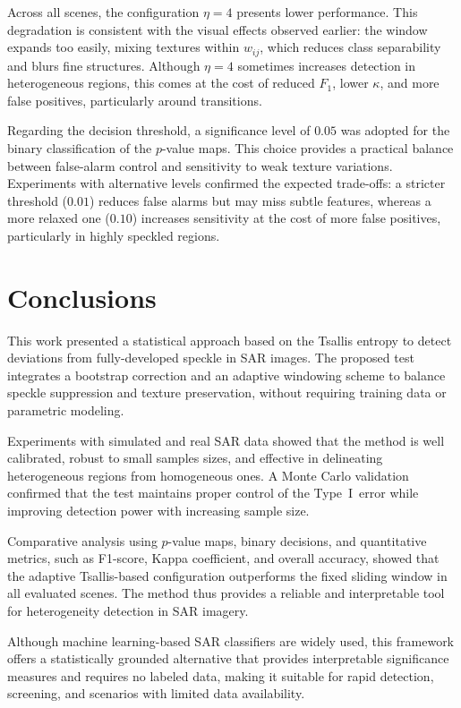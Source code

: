 \documentclass[
  lettersize  journal,
]{IEEEtran}%
\begin{document}
Across all scenes, the configuration \(\eta = 4\) presents lower
performance. This degradation is consistent with the visual effects
observed earlier: the window expands too easily, mixing textures within
\(w_{ij}\), which reduces class separability and blurs fine structures.
Although \(\eta = 4\) sometimes increases detection in heterogeneous
regions, this comes at the cost of reduced \(F_1\), lower \(\kappa\),
and more false positives, particularly around transitions.

Regarding the decision threshold, a significance level of \(0.05\) was
adopted for the binary classification of the \(p\)-value maps. This
choice provides a practical balance between false-alarm control and
sensitivity to weak texture variations. Experiments with alternative
levels confirmed the expected trade-offs: a stricter threshold
(\(0.01\)) reduces false alarms but may miss subtle features, whereas a
more relaxed one (\(0.10\)) increases sensitivity at the cost of more
false positives, particularly in highly speckled regions.

\section{Conclusions}\label{sec:conclusion}

This work presented a statistical approach based on the Tsallis entropy
to detect deviations from fully-developed speckle in SAR images. The
proposed test integrates a bootstrap correction and an adaptive
windowing scheme to balance speckle suppression and texture
preservation, without requiring training data or parametric modeling.

Experiments with simulated and real SAR data showed that the method is
well calibrated, robust to small samples sizes, and effective in
delineating heterogeneous regions from homogeneous ones. A Monte Carlo
validation confirmed that the test maintains proper control of the
Type~I~error while improving detection power with increasing sample
size.

Comparative analysis using \(p\)-value maps, binary decisions, and
quantitative metrics, such as F1-score, Kappa coefficient, and overall
accuracy, showed that the adaptive Tsallis-based configuration
outperforms the fixed sliding window in all evaluated scenes. The method
thus provides a reliable and interpretable tool for heterogeneity
detection in SAR imagery.

Although machine learning-based SAR classifiers are widely used, this
framework offers a statistically grounded alternative that provides
interpretable significance measures and requires no labeled data, making
it suitable for rapid detection, screening, and scenarios with limited
data availability.
\end{document}
